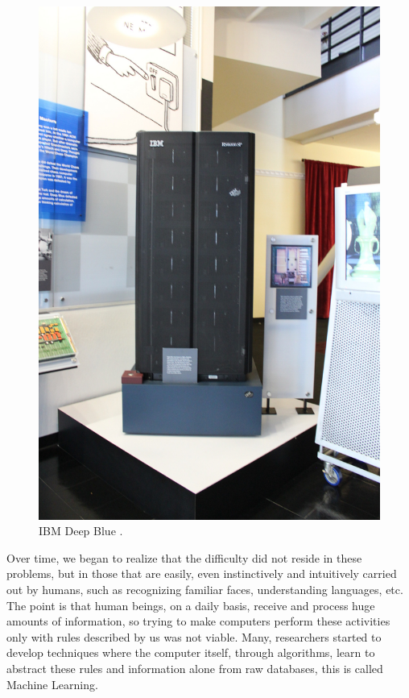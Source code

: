 \begin{figure}
    \centering
    \includegraphics[scale=0.1]{"Part 3 - Learning Systems/Introduction/figure100.jpg"}
    \caption{IBM Deep Blue \cite{img:deepblue}.}
    \label{fig:figure100}
\end{figure}
\newpage

Over time, we began to realize that the difficulty did not reside in these problems, but in those that are easily, even instinctively and intuitively carried out by humans, such as recognizing familiar faces, understanding languages, etc. The point is that human beings, on a daily basis, receive and process huge amounts of information, so trying to make computers perform these activities only with rules described by us was not viable. Many, researchers started to develop techniques where the computer itself, through algorithms, learn to abstract these rules and information alone from raw databases, this is called Machine Learning.

